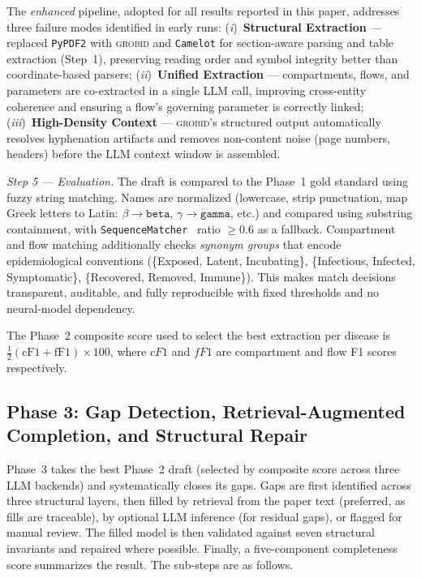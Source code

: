 The \emph{enhanced} pipeline, adopted for all results reported in this paper, addresses three failure modes identified in early runs: 
(\textit{i})~\textbf{Structural Extraction} --- replaced \texttt{PyPDF2} with \textsc{grobid} and \texttt{Camelot} for section-aware parsing and table extraction (Step~1), preserving reading order and symbol integrity better than coordinate-based parsers; 
(\textit{ii})~\textbf{Unified Extraction} --- compartments, flows, and parameters are co-extracted in a single LLM call, improving cross-entity coherence and ensuring a flow's governing parameter is correctly linked; 
(\textit{iii})~\textbf{High-Density Context} --- \textsc{grobid}'s structured output automatically resolves hyphenation artifacts and removes non-content noise (page numbers, headers) before the LLM context window is assembled. 


\textit{Step 5 --- Evaluation.}
\label{sec:phase2eval}
The draft is compared to the Phase~1 gold standard using fuzzy string matching.
Names are normalized (lowercase, strip punctuation, map Greek letters to Latin:
$\beta \to \mathtt{beta}$, $\gamma \to \mathtt{gamma}$, etc.) and compared using
substring containment, with \texttt{SequenceMatcher}~\cite{python_difflib} ratio
$\geq 0.6$ as a fallback. Compartment and flow matching additionally checks
\emph{synonym groups} that encode epidemiological
conventions (\{Exposed, Latent, Incubating\}, \{Infectious, Infected, Symptomatic\},
\{Recovered, Removed, Immune\}). This makes match decisions
transparent, auditable, and fully reproducible with fixed thresholds and no
neural-model dependency.

The Phase~2 composite score used to select the best extraction per disease is
$\frac{1}{2}(\text{cF1} + \text{fF1}) \times 100$, where $cF1$ and $fF1$ are
compartment and flow F1 scores respectively.

\subsection{Phase 3: Gap Detection, Retrieval-Augmented Completion, and Structural Repair}
\label{sec:phase3}

Phase~3 takes the best Phase~2 draft (selected by composite score across three LLM backends)
and systematically closes its gaps. Gaps are first identified across three structural layers, then filled
by retrieval from the paper text (preferred, as fills are traceable), by optional LLM
inference (for residual gaps), or flagged for manual review.
The filled model is then validated against seven structural invariants and repaired where
possible. Finally, a five-component completeness score summarizes the result.
The sub-steps are as follows.

